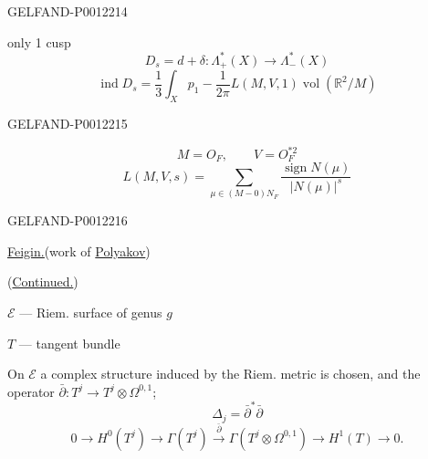 \begin{GelfandAdjacentEvidence}{GELFAND-P001221}{4}


only 1 cusp
\begin{equation*}
D_s=d+\delta:\Lambda^*_+(X)\longrightarrow\Lambda^*_-(X)
\end{equation*}
\begin{equation*}
\operatorname{ind}D_s=\frac13\int_X p_1-\frac1{2\pi}L(M,V,1)\operatorname{vol}(\mathbb R^2/M)
\end{equation*}
\end{GelfandAdjacentEvidence}
\begin{GelfandAdjacentEvidence}{GELFAND-P001221}{5}

\begin{equation*}
M=O_F,\qquad V=O_F^{*2}
\end{equation*}
\begin{equation*}
L(M,V,s)=\sum_{\mu\in(M-0)N_F}\frac{\operatorname{sign}N(\mu)}{|N(\mu)|^s}
\end{equation*}
\end{GelfandAdjacentEvidence}
\begin{GelfandAdjacentEvidence}{GELFAND-P001221}{6}


\underline{\underline{Feigin.}}\qquad{}\qquad(work of \underline{Polyakov})

(\underline{Continued.})

\(\mathcal E\) --- Riem. surface of genus \(g\)

\(T\) --- tangent bundle

On \(\mathcal E\) a complex structure induced by the Riem. metric is chosen, and the operator \(\bar\partial:T^j\longrightarrow T^j\otimes\Omega^{0,1}\);
\begin{equation*}
\Delta_j=\bar\partial^*\bar\partial
\end{equation*}
\begin{equation*}
0\longrightarrow H^0(T^j)\longrightarrow\Gamma(T^j)
\overset{\bar\partial}{\longrightarrow}\Gamma(T^j\otimes\Omega^{0,1})
\longrightarrow H^1(T)\longrightarrow0.\tag{1}
\end{equation*}
\end{GelfandAdjacentEvidence}



